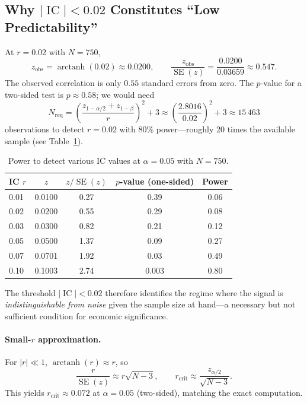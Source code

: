 \documentclass[11pt,a4paper]{article}
\theoremstyle{definition}
\newcommand{\IC}{\operatorname{IC}}
\newcommand{\SE}{\operatorname{SE}}
\newcommand{\arctanh}{\operatorname{arctanh}}
\begin{document}
\subsection{Why \texorpdfstring{$|\IC| < 0.02$}{IC < 0.02} Constitutes ``Low Predictability''}

At $r = 0.02$ with $N = 750$,
\begin{equation}
    z_{\text{obs}} = \arctanh(0.02) \approx 0.0200,
    \qquad
    \frac{z_{\text{obs}}}{\SE(z)} = \frac{0.0200}{0.03659} \approx 0.547.
\end{equation}
The observed correlation is only $0.55$ standard errors from zero.  The
$p$-value for a two-sided test is $p \approx 0.58$; we would need
\begin{equation}
    N_{\text{req}} = \left(\frac{z_{1-\alpha/2} + z_{1-\beta}}{r}\right)^{\!2}
                   + 3 \approx \left(\frac{2.8016}{0.02}\right)^{\!2} + 3
                   \approx 15\,463
\end{equation}
observations to detect $r = 0.02$ with $80\%$ power---roughly 20 times
the available sample (see Table~\ref{tab:power}).

\begin{table}[htbp]
\centering
\caption{Power to detect various IC values at $\alpha=0.05$ with $N=750$.}
\label{tab:power}
\begin{tabular}{lcccc}
\toprule
IC $r$ & $z$ & $z/\SE(z)$ & $p$-value (one-sided) & Power \\
\midrule
0.01 & 0.0100 & 0.27 & 0.39 & 0.06 \\
0.02 & 0.0200 & 0.55 & 0.29 & 0.08 \\
0.03 & 0.0300 & 0.82 & 0.21 & 0.12 \\
0.05 & 0.0500 & 1.37 & 0.09 & 0.27 \\
0.07 & 0.0701 & 1.92 & 0.03 & 0.49 \\
0.10 & 0.1003 & 2.74 & 0.003 & 0.80 \\
\bottomrule
\end{tabular}
\end{table}

The threshold $|\IC| < 0.02$ therefore identifies the regime where the
signal is \emph{indistinguishable from noise} given the sample size at
hand---a necessary but not sufficient condition for economic significance.

\paragraph{Small-$r$ approximation.}
For $|r| \ll 1$, $\arctanh(r) \approx r$, so
\begin{equation}
    \frac{r}{\SE(z)} \approx r\sqrt{N-3},
    \qquad
    r_{\text{crit}} \approx \frac{z_{\alpha/2}}{\sqrt{N-3}}.
\end{equation}
This yields $r_{\text{crit}} \approx 0.072$ at $\alpha = 0.05$ (two-sided),
matching the exact computation.
\end{document}
